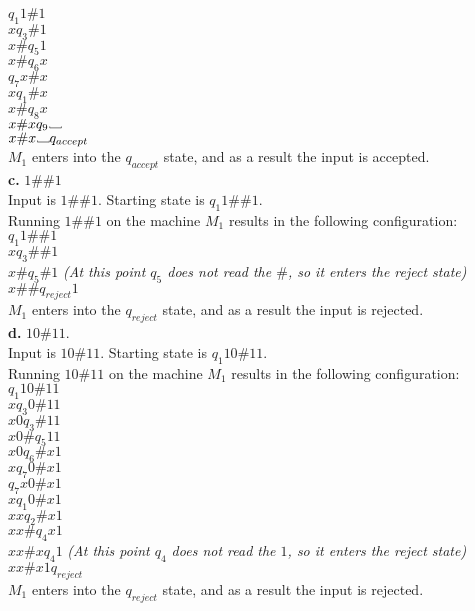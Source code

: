 \documentclass[12pt]{article}
\newcommand\Vtextvisiblespace[1][.8em]{%
	\mbox{\kern.07em\vrule height.3ex}%
	\vbox{\hrule width#1}%
	\hbox{\vrule height.3ex}}
\begin{document}
$       q_1 1 \# 1  $ \\
$x      q_3 \# 1    $ \\
$x \#   q_5 1       $ \\
$x \#   q_6 x       $ \\
$       q_7 x \# x  $ \\
$x      q_1 \# x    $ \\
$x \#   q_8 x       $ \\
$x \# x q_9 \Vtextvisiblespace $ \\
$x \# x \Vtextvisiblespace q_{accept} $ \\
$M_1$ enters into the $q_{accept}$ state, and as a result the input is accepted. \\

\pagebreak
\textbf{c.} $1\#\#1$ \\

Input is $1\#\#1$. Starting state is $q_1 1\#\#1$. \\
Running $1\#\#1$ on the machine $M_1$ results in the following configuration: \\

$q_1 1 \# \# 1$ \\
$x q_3 \# \# 1$ \\
$x \# q_5 \# 1$ \textit{(At this point $q_5$ does not read the $\#$, so it enters the reject state)} \\
$x \# \# q_{reject} 1 $ \\
$M_1$ enters into the $q_{reject}$ state, and as a result the input is rejected. \\

\textbf{d.} $10\#11$. \\

Input is $10\#11$. Starting state is $q_1 10\#11$. \\
Running $10\#11$ on the machine $M_1$ results in the following configuration: \\

$        q_1 10 \# 11  $ \\
$x       q_3 0 \# 11   $ \\
$x0      q_3 \# 11     $ \\
$x0 \#   q_5 11        $ \\
$x0      q_6 \# x 1    $ \\
$x       q_7 0 \# x 1    $ \\
$        q_7 x 0 \# x 1  $ \\
$x       q_1 0 \# x 1    $ \\
$xx      q_2 \# x 1      $ \\
$xx \#   q_4 x 1         $ \\
$xx \# x q_4 1 $ \textit{(At this point $q_4$ does not read the $1$, so it enters the reject state)} \\
$xx \# x 1 q_{reject}    $ \\
$M_1$ enters into the $q_{reject}$ state, and as a result the input is rejected. \\
\end{document}
